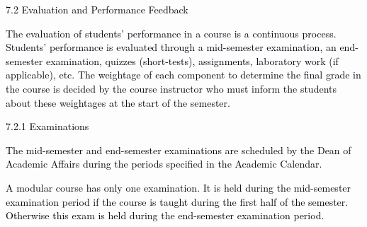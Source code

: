 \documentclass[12pt]{article}
\begin{document}
\vspace{\baselineskip}
\textcolor[HTML]{00000A}{7.2 Evaluation and Performance Feedback}\par


\vspace{\baselineskip}
\begin{adjustwidth}{0.0in}{0.07in}
{\fontsize{10pt}{12.0pt}\selectfont \textcolor[HTML]{00000A}{The evaluation of students' performance in a course is a continuous process. Students' performance is evaluated through a mid-semester examination, an end-semester examination, quizzes (short-tests), assignments, laboratory work (if applicable), etc. The weightage of each component to determine the final grade in the course is decided by the course instructor who must inform the students about these weightages at the start of the semester.}\par}\par

\end{adjustwidth}


\vspace{\baselineskip}
{\fontsize{10pt}{12.0pt}\selectfont \textcolor[HTML]{00000A}{7.2.1 Examinations}\par}\par


\vspace{\baselineskip}
\begin{adjustwidth}{0.0in}{0.51in}
{\fontsize{10pt}{12.0pt}\selectfont \textcolor[HTML]{00000A}{The mid-semester and end-semester examinations are scheduled by the Dean of Academic Affairs during the periods specified in the Academic Calendar.}\par}\par

\end{adjustwidth}


\vspace{\baselineskip}
\begin{adjustwidth}{0.0in}{0.28in}
{\fontsize{9pt}{10.8pt}\selectfont \textcolor[HTML]{00000A}{A modular course has only one examination. It is held during the mid-semester examination period if the course is taught during the first half of the semester. Otherwise this exam is held during the end-semester examination period.}\par}\par

\end{adjustwidth}
\end{document}

